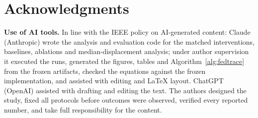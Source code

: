 \documentclass{article}
\begin{document}
\section{Acknowledgments}
\textbf{Use of AI tools.} In line with the IEEE policy on AI-generated content: Claude (Anthropic) wrote the analysis and evaluation code for the matched interventions, baselines, ablations and median-displacement analysis; under author supervision it executed the runs, generated the figures, tables and Algorithm~\ref{alg:fedtrace} from the frozen artifacts, checked the equations against the frozen implementation, and assisted with editing and \LaTeX{} layout. ChatGPT (OpenAI) assisted with drafting and editing the text. The authors designed the study, fixed all protocols before outcomes were observed, verified every reported number, and take full responsibility for the content.



\end{document}
